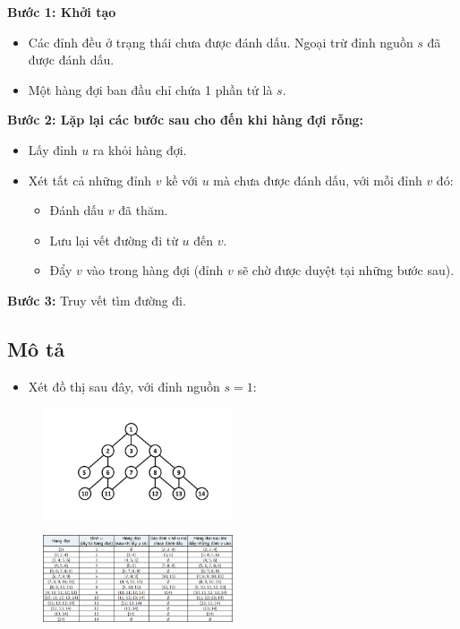 \textbf{Bước 1: Khởi tạo}
\begin{itemize}
    \item Các đỉnh đều ở trạng thái chưa được đánh dấu. Ngoại trừ đỉnh nguồn $s$ đã được đánh dấu.
    \item Một hàng đợi ban đầu chỉ chứa 1 phần tử là $s$.
\end{itemize}

\textbf{Bước 2: Lặp lại các bước sau cho đến khi hàng đợi rỗng:}
\begin{itemize}
    \item Lấy đỉnh $u$ ra khỏi hàng đợi.
    \item Xét tất cả những đỉnh $v$ kề với $u$ mà chưa được đánh dấu, với mỗi đỉnh $v$ đó:
    \begin{itemize}
        \item Đánh dấu $v$ đã thăm.
        \item Lưu lại vết đường đi từ $u$ đến $v$.
        \item Đẩy $v$ vào trong hàng đợi (đỉnh $v$ sẽ chờ được duyệt tại những bước sau).
    \end{itemize}
\end{itemize}

\textbf{Bước 3:} Truy vết tìm đường đi.

\subsection{Mô tả}

\begin{itemize}
    \item Xét đồ thị sau đây, với đỉnh nguồn $s = 1$:
\end{itemize}

\begin{figure}[h]
    \centering
    \includegraphics[width=0.5\textwidth]{resource/img/b6/breadth-first-search_img3.png}
\end{figure}
\begin{figure}[h]
    \centering
    \includegraphics[width=0.5\textwidth]{resource/img/b6/breadth-first-search_img4.png}
\end{figure}

